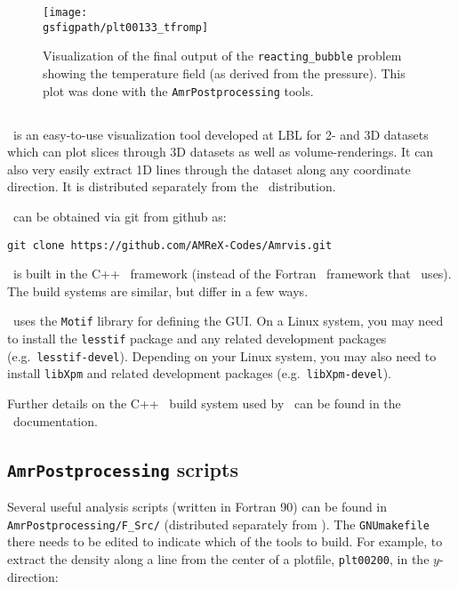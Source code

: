 \begin{figure}[t]
\centering
\texttt{[image: \\gsfigpath/plt00133\_tfromp]}
\caption[Visualization of {\tt reacting\_bubble} output]{\label{fig:gettingstarted:test2} Visualization of the
final output of the {\tt reacting\_bubble} problem showing the temperature
field (as derived from the pressure).  This plot was done with
the {\tt AmrPostprocessing} tools.}
\end{figure}



\subsection{\amrvis}

\amrvis\ is an easy-to-use visualization tool developed at LBL for
2- and 3D datasets which can plot slices through 3D datasets as well
as volume-renderings.  It can also very easily extract 1D lines
through the dataset along any coordinate direction.  It is distributed
separately from the \maestro\ distribution.

\amrvis\ can be obtained via git from github as:
\begin{verbatim}
git clone https://github.com/AMReX-Codes/Amrvis.git
\end{verbatim}
\amrvis\ is built in the C++ \amrex\ framework (instead of the Fortran 
\amrex\ framework that \maestro\ uses).  The build systems are similar,
but differ in a few ways.  

\amrvis\ uses the {\tt Motif} library for defining the GUI.  On a Linux 
system, you may need to install the {\tt lesstif} package and any
related development packages (e.g.\ {\tt lesstif-devel}).  Depending
on your Linux system, you may also need to install {\tt libXpm} and
related development packages (e.g.\ {\tt libXpm-devel}).  

Further details on the C++ \amrex\ build system used by \amrvis\
can be found in the \amrex\ documentation.


\subsection{{\tt AmrPostprocessing} scripts}

Several useful analysis scripts (written in Fortran 90) can be found
in {\tt AmrPostprocessing/F\_Src/} (distributed separately
from \maestro).  The {\tt GNUmakefile} there needs to be edited to
indicate which of the tools to build.  For example, to extract the
density along a line from the center of a plotfile, {\tt plt00200}, in
the $y$-direction:

